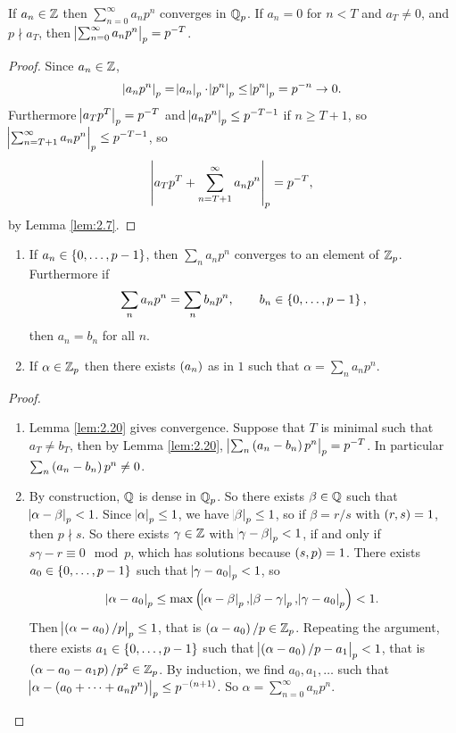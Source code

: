 \begin{lemma}
\label{lem:2.20}
If $ a_n \in \mathbb{Z} $ then $ \sum_{n = 0}^\infty a_np^n $ converges in $ \mathbb{Q}_p $. If $ a_n = 0 $ for $ n < T $ and $ a_T \ne 0 $, and $ p \nmid a_T $, then $ \abs{\sum_{n = 0}^\infty a_np^n}_p = p^{-T} $.
\end{lemma}

\begin{proof}
Since $ a_n \in \mathbb{Z} $,
$$ \abs{a_np^n}_p = \abs{a_n}_p \cdot \abs{p^n}_p \le \abs{p^n}_p = p^{-n} \to 0. $$
Furthermore $ \abs{a_Tp^T}_p = p^{-T} $ and $ \abs{a_np^n}_p \le p^{-T - 1} $ if $ n \ge T + 1 $, so $ \abs{\sum_{n = T + 1}^\infty a_np^n}_p \le p^{-T - 1} $, so
$$ \abs{a_Tp^T + \sum_{n = T + 1}^\infty a_np^n}_p = p^{-T}, $$
by Lemma \ref{lem:2.7}.
\end{proof}


\begin{proposition}
\label{prop:2.21}
\hfill
\begin{enumerate}
\item If $ a_n \in \cbr{0, \dots, p - 1} $, then $ \sum_n a_np^n $ converges to an element of $ \mathbb{Z}_p $. Furthermore if
$$ \sum_n a_np^n = \sum_n b_np^n, \qquad b_n \in \cbr{0, \dots, p - 1}, $$
then $ a_n = b_n $ for all $ n $.
\item If $ \alpha \in \mathbb{Z}_p $ then there exists $ \br{a_n} $ as in $ 1 $ such that $ \alpha = \sum_n a_np^n $.
\end{enumerate}
\end{proposition}

\begin{proof}
\hfill
\begin{enumerate}
\item Lemma \ref{lem:2.20} gives convergence. Suppose that $ T $ is minimal such that $ a_T \ne b_T $, then by Lemma \ref{lem:2.20}, $ \abs{\sum_n \br{a_n - b_n}p^n}_p = p^{-T} $. In particular $ \sum_n \br{a_n - b_n}p^n \ne 0 $.
\item By construction, $ \mathbb{Q} $ is dense in $ \mathbb{Q}_p $. So there exists $ \beta \in \mathbb{Q} $ such that $ \abs{\alpha - \beta}_p < 1 $. Since $ \abs{\alpha}_p \le 1 $, we have $ \abs{\beta}_p \le 1 $, so if $ \beta = r / s $ with $ \br{r, s} = 1 $, then $ p \nmid s $. So there exists $ \gamma \in \mathbb{Z} $ with $ \abs{\gamma - \beta}_p < 1 $, if and only if $ s\gamma - r \equiv 0 \mod p $, which has solutions because $ \br{s, p} = 1 $. There exists $ a_0 \in \cbr{0, \dots, p - 1} $ such that $ \abs{\gamma - a_0}_p < 1 $, so
$$ \abs{\alpha - a_0}_p \le \max\br{\abs{\alpha - \beta}_p, \abs{\beta - \gamma}_p, \abs{\gamma - a_0}_p} < 1. $$
Then $ \abs{\br{\alpha - a_0} / p}_p \le 1 $, that is $ \br{\alpha - a_0} / p \in \ZZ_p $. Repeating the argument, there exists $ a_1 \in \cbr{0, \dots, p - 1} $ such that $ \abs{\br{\alpha - a_0} / p - a_1}_p < 1 $, that is $ \br{\alpha - a_0 - a_1p} / p^2 \in \ZZ_p $. By induction, we find $ a_0, a_1, \dots $ such that $ \abs{\alpha - \br{a_0 + \dots + a_np^n}}_p \le p^{-\br{n + 1}} $. So $ \alpha = \sum_{n = 0}^\infty a_np^n $.
\end{enumerate}
\end{proof}

